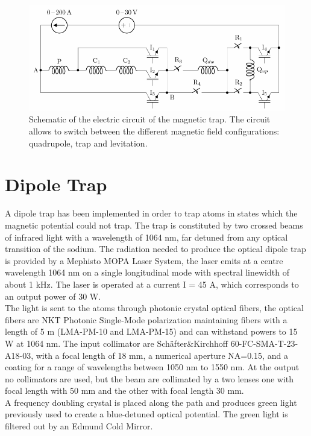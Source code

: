 \documentclass[../thesis.tex]{subfiles}
\begin{document}
\begin{figure}[!htb]
\centering
\includegraphics[scale=1]{circ_mot.pdf}
\caption{Schematic of the electric circuit of the magnetic trap. The circuit allows to switch between the different magnetic field configurations: quadrupole, trap and levitation.}
\label{fig:circ_mot}
\end{figure}


\section{Dipole Trap}

A dipole trap has been implemented in order to trap atoms in states which the magnetic potential could not trap. The trap is constituted by two crossed beams of infrared light with a wavelength of 1064 nm, far detuned from any optical transition of the sodium. The radiation needed to produce the optical dipole trap is provided by a Mephisto MOPA Laser System, the laser emits at a centre wavelength 1064 nm on a single longitudinal mode with spectral linewidth of about 1 kHz. The laser is operated at a current I = 45 A, which corresponds to an output power of 30 W.\\
The light is sent to the atoms through photonic crystal optical fibers, the optical fibers are NKT Photonic Single-Mode polarization maintaining fibers with a length of 5 m (LMA-PM-10 and LMA-PM-15) and can withstand powers to 15 W at 1064 nm. The input collimator are Schäfter\&Kirchhoff 60-FC-SMA-T-23-A18-03, with a focal length of 18 mm, a numerical aperture NA=0.15, and a coating for a range of wavelengths between 1050 nm to 1550 nm. At the output no collimators are used, but the beam are collimated by a two lenses one with focal length with 50 mm and the other with focal length 30 mm.\\
A frequency doubling crystal is placed along the path and produces green light previously used to create a blue-detuned optical potential. The green light is filtered out by an Edmund Cold Mirror.\\
\end{document}
